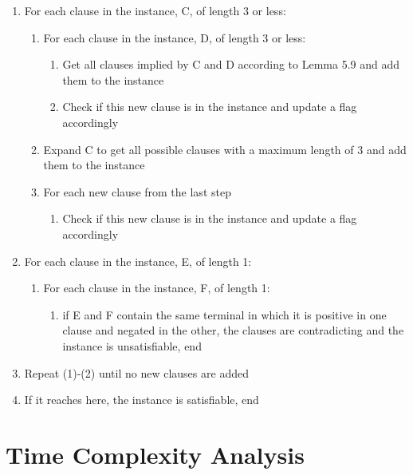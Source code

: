 \documentclass[manuscript]{acmart}
\begin{document}
    \begin{enumerate}
        \item For each clause in the instance, C, of length 3 or less:
        \begin{enumerate}
            \item For each clause in the instance, D, of length 3 or less:
            \begin{enumerate}
                \item Get all clauses implied by C and D according to Lemma 5.9 
                and add them to the instance
                \item Check if this new clause is in the instance and update a flag accordingly
            \end{enumerate}
            \item Expand C to get all possible clauses with a maximum length of 3 and add them to the instance
            \item For each new clause from the last step
            \begin{enumerate}
                \item Check if this new clause is in the instance and update a flag accordingly
            \end{enumerate}
        \end{enumerate}
        \item For each clause in the instance, E, of length 1:
        \begin{enumerate}
            \item For each clause in the instance, F, of length 1:
            \begin{enumerate}
                \item if E and F contain the same terminal in which it is 
                positive in one clause and negated in the other, the 
                clauses are contradicting and the instance is unsatisfiable, end
            \end{enumerate}
        \end{enumerate}
        \item Repeat (1)-(2) until no new clauses are added
        \item If it reaches here, the instance is satisfiable, end
    \end{enumerate}

    \section{Time Complexity Analysis}
\end{document}
